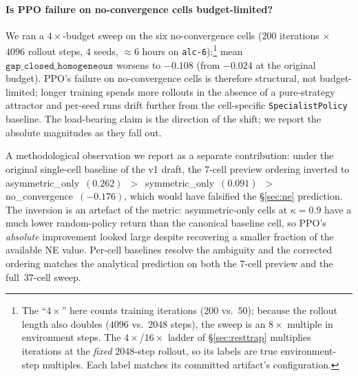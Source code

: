 \documentclass{anvil-paper}
\begin{document}
\paragraph{Is PPO failure on no-convergence cells budget-limited?}
We ran a $4{\times}$-budget sweep on the six no-convergence cells
($200$ iterations $\times$ $4096$ rollout steps, $4$ seeds, $\approx 6$ hours
on \texttt{alc-6}):\footnote{The ``$4{\times}$'' here counts training
iterations ($200$ vs.\ $50$); because the rollout length also doubles
($4096$ vs.\ $2048$ steps), the sweep is an $8{\times}$ multiple in
environment steps. The $4{\times}$/$16{\times}$ ladder of
\S\ref{sec:resttrap} multiplies iterations at the \emph{fixed}
$2048$-step rollout, so its labels are true environment-step multiples.
Each label matches its committed artifact's configuration.} mean
$\texttt{gap\_closed\_homogeneous}$ worsens to
$-0.108$ (from $-0.024$ at the original budget). PPO's failure on
no-convergence cells is therefore structural, not budget-limited; longer
training spends more rollouts in the absence of a pure-strategy attractor
and per-seed runs drift further from the cell-specific
\texttt{SpecialistPolicy} baseline. The load-bearing claim is the direction
of the shift; we report the absolute magnitudes as they fall out.

A methodological observation we report as a separate contribution:
under the original single-cell baseline of the v1 draft, the 7-cell
preview ordering inverted to
\textsf{asymmetric\_only}~$(0.262)$~$>$~\textsf{symmetric\_only}~$(0.091)$~$>$~%
\textsf{no\_convergence}~$(-0.176)$, which would have falsified the
\S\ref{sec:ne} prediction. The inversion is an artefact of the metric:
asymmetric-only cells at $\kappa{=}0.9$ have a much lower random-policy
return than the canonical baseline cell, so PPO's \emph{absolute}
improvement looked large despite recovering a smaller fraction of the
available NE value. Per-cell baselines resolve the ambiguity and the
corrected ordering matches the analytical prediction on both the 7-cell
preview and the full~$37$-cell sweep.
\end{document}
